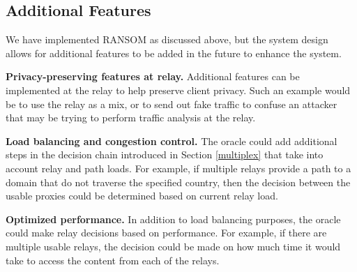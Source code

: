 \subsection{Additional Features}
We have implemented RANSOM as discussed above, but the system design allows for 
additional features to be added in the future to enhance the system.

{\bf Privacy-preserving features at relay.}  Additional features can be 
implemented at the relay to help preserve client privacy.  Such an example would 
be to use the relay as a mix, or to send out fake traffic to confuse an 
attacker that may be trying to perform traffic analysis at the relay.

{\bf Load balancing and congestion control.} The oracle could add additional 
steps in the decision chain introduced in Section \ref{multiplex} that take 
into account relay and path loads.  For example, if multiple relays provide 
a path to a domain that do not traverse the specified country, then the 
decision between the usable proxies could be determined based on current relay 
load.

{\bf Optimized performance.} In addition to load balancing purposes, the oracle 
could make relay decisions based on performance.  For example, if there are 
multiple usable relays, the decision could be made on how much time it would 
take to access the content from each of the relays.
